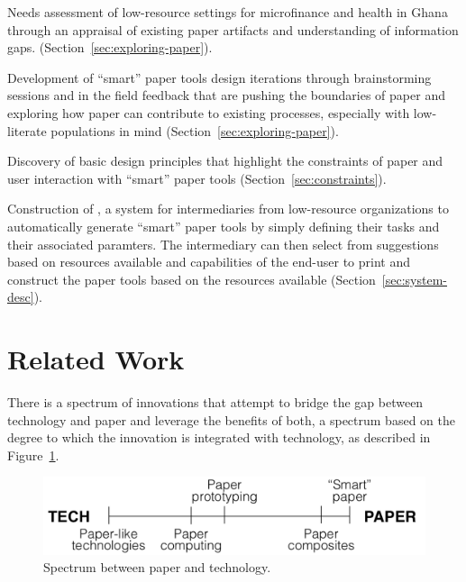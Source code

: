 \documentclass{sig-alternate}
\begin{document}
\begin{compactitem}

  \item Needs assessment of low-resource settings for microfinance and health in Ghana through an appraisal of existing paper artifacts and understanding of information gaps. (Section~\ref{sec:exploring-paper}).
  \item Development of ``smart'' paper tools design iterations through brainstorming sessions and in the field feedback that are pushing the boundaries of paper and exploring how paper can contribute to existing processes, especially with low-literate populations in mind (Section~\ref{sec:exploring-paper}).
  \item Discovery of basic design principles that highlight the constraints of paper and user interaction with ``smart'' paper tools (Section~\ref{sec:constraints}).
  \item Construction of \nifty, a system for intermediaries from low-resource organizations to automatically generate ``smart'' paper tools by simply defining their tasks and their associated paramters. The intermediary can then select from suggestions based on resources available and capabilities of the end-user to print and construct the paper tools based on the resources available (Section~\ref{sec:system-desc}). 

\end{compactitem}


\section{Related Work}

There is a spectrum of innovations that attempt to bridge the gap between technology and paper and leverage the benefits of both, a spectrum based on the degree to which the innovation is integrated with technology, as described in Figure~\ref{fig:spectrum}.

\begin{figure}
\centering
\includegraphics[width=\linewidth]{img/spectrum.png}
\caption{Spectrum between paper and technology.}
\label{fig:spectrum}
\end{figure}
\end{document}
